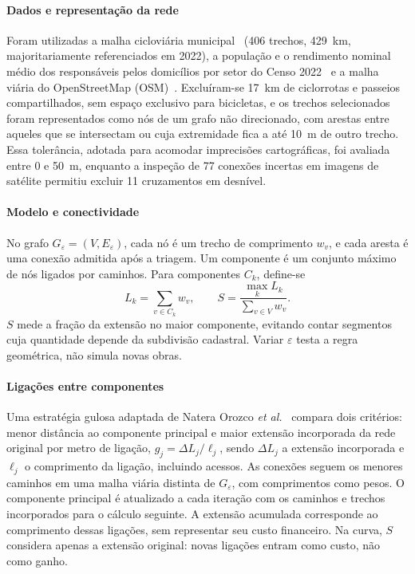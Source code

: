 \documentclass[10pt,a4paper,twocolumn]{article}
\begin{document}
\paragraph{Dados e representação da rede} Foram utilizadas a malha cicloviária municipal~\cite{fortaleza2024}
(406 trechos, 429~km, majoritariamente referenciados em 2022), a população
e o rendimento nominal médio dos responsáveis pelos domicílios por setor
do Censo 2022~\cite{ibge2022} e a malha viária do OpenStreetMap
(OSM)~\cite{osm2026}. Excluíram-se 17~km de ciclorrotas e passeios
compartilhados, sem espaço exclusivo para bicicletas, e os trechos
selecionados foram representados como nós de um grafo não direcionado,
com arestas entre aqueles que se intersectam ou cuja extremidade fica
a até 10~m de outro trecho. Essa tolerância, adotada para acomodar
imprecisões cartográficas, foi avaliada entre 0 e 50~m, enquanto a inspeção
de 77 conexões incertas em imagens de satélite permitiu excluir
11 cruzamentos em desnível.

\paragraph{Modelo e conectividade} No grafo $G_\varepsilon=(V,E_\varepsilon)$,
cada nó é um trecho de comprimento $w_v$, e cada aresta é uma conexão
admitida após a triagem. Um componente é um conjunto máximo de nós
ligados por caminhos. Para componentes $C_k$, define-se
\begin{equation}
 L_k=\sum_{v\in C_k}w_v,\qquad S=\frac{\max_k L_k}{\sum_{v\in V}w_v}.
\end{equation}
$S$ mede a fração da extensão no maior componente, evitando contar
segmentos cuja quantidade depende da subdivisão cadastral. Variar
$\varepsilon$ testa a regra geométrica, não simula novas obras.

\paragraph{Ligações entre componentes} Uma estratégia gulosa adaptada
de Natera Orozco \emph{et al.}~\cite{natera2020} compara dois critérios:
menor distância ao componente principal e maior extensão incorporada da
rede original por metro de ligação, $g_j=\Delta L_j/\ell_j$, sendo
$\Delta L_j$ a extensão incorporada e $\ell_j$ o comprimento da ligação,
incluindo acessos. As conexões seguem os menores caminhos em uma malha
viária distinta de $G_\varepsilon$, com comprimentos como pesos.
O componente principal é atualizado
a cada iteração com os caminhos e trechos incorporados para o cálculo
seguinte. A extensão acumulada corresponde ao comprimento dessas ligações,
sem representar seu custo financeiro. Na curva, $S$ considera apenas
a extensão original: novas ligações entram como custo, não como ganho.
\end{document}
